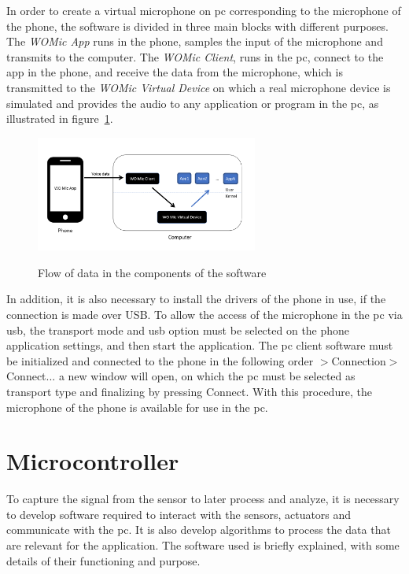 In order to create a virtual microphone on \acrshort{pc} corresponding to the microphone of the phone, the software is divided in three main blocks with different purposes. The \textit{WOMic App} runs in the phone, samples the input of the microphone and transmits to the computer. The \textit{WOMic Client}, runs in the \acrshort{pc}, connect to the app in the phone, and receive the data from the microphone, which is transmitted to the \textit{WOMic Virtual Device} on which a real microphone device is simulated and provides the audio to any application or program in the \acrshort{pc}, as illustrated in figure~\ref{fig:diagramWOMIC}.

\begin{figure}[]
    \centering
    \includegraphics[width=0.65\textwidth]{Chapters/5CHP/Images/WOMICDiag.png}
    \caption{Flow of data in the components of the software}{\cite{WOMicFREE}}
    \label{fig:diagramWOMIC}
\end{figure}
In addition, it is also necessary to install the drivers of the phone in use, if the connection is made over USB. To allow the access of the microphone in the \acrshort{pc} via \acrshort{usb}, the transport mode and \acrshort{usb} option must be selected on the phone application settings, and then start the application. The \acrshort{pc} client software must be initialized and connected to the phone in the following order {$>$Connection$>$Connect...} a new window will open, on which the \acrshort{pc} must be selected as transport type and finalizing by pressing Connect. With this procedure, the microphone of the phone is available for use in the \acrshort{pc}\cite{WOMicFREE}.

\section{Microcontroller}
To capture the signal from the sensor to later process and analyze, it is necessary to develop software required to interact with the sensors, actuators and communicate with the \acrshort{pc}. It is also develop algorithms to process the data that are relevant for the application. The software used is briefly explained, with some details of their functioning and purpose.

